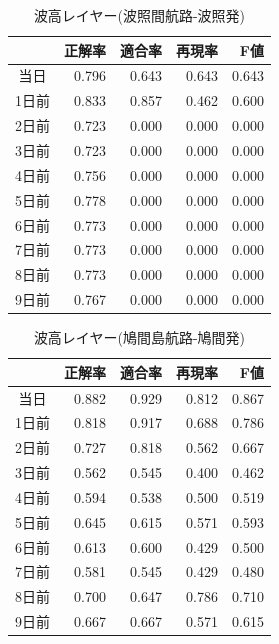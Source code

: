 \documentclass[twocolumn,twoside,9.5pt]{jsarticle}
\begin{document}
\begin{table}[H]
  \begin{center}
    \caption{波高レイヤー(波照間航路-波照発)}
    \begin{tabular}{|c|r|r|r|r|} \hline
   &正解率 & 適合率 & 再現率 & F値 \\ \hline
      当日&0.796 &0.643 &0.643 &0.643 \\ \hline
     1日前 & 0.833 & 0.857 & 0.462 & 0.600 \\ \hline
      2日前 & 0.723 & 0.000 & 0.000 & 0.000 \\ \hline
      3日前 & 0.723 & 0.000 & 0.000 & 0.000 \\ \hline 
      4日前 & 0.756 & 0.000 & 0.000 & 0.000 \\ \hline 
      5日前 & 0.778 & 0.000 & 0.000 & 0.000 \\ \hline 
      6日前 & 0.773 & 0.000 & 0.000 & 0.000 \\ \hline 
      7日前 & 0.773 & 0.000 & 0.000 & 0.000 \\ \hline 
      8日前 & 0.773 & 0.000 & 0.000 & 0.000 \\ \hline 
      9日前 & 0.767 & 0.000 & 0.000 & 0.000 \\ \hline 
    \end{tabular}    
    \label{img_wave_hateruma}
  \end{center}
\end{table}

\begin{table}[H]
  \begin{center}
    \caption{波高レイヤー(鳩間島航路-鳩間発)}
    \begin{tabular}{|c|r|r|r|r|} \hline
   &正解率 & 適合率 & 再現率 & F値 \\ \hline
      当日 & 0.882 & 0.929 & 0.812 & 0.867 \\ \hline
     1日前 & 0.818 & 0.917 & 0.688 & 0.786 \\ \hline
      2日前 & 0.727 & 0.818 & 0.562 & 0.667 \\ \hline
      3日前 & 0.562 & 0.545 & 0.400 & 0.462 \\ \hline 
      4日前 & 0.594 & 0.538 & 0.500 & 0.519 \\ \hline 
      5日前 & 0.645 & 0.615 & 0.571 & 0.593 \\ \hline 
      6日前 & 0.613 & 0.600 & 0.429 & 0.500 \\ \hline 
      7日前 & 0.581 & 0.545 & 0.429 & 0.480 \\ \hline 
      8日前 & 0.700 & 0.647 & 0.786 & 0.710 \\ \hline 
      9日前 & 0.667 & 0.667 & 0.571 & 0.615 \\ \hline 
    \end{tabular}    
    \label{img_wave_hatoma}
  \end{center}
\end{table}
\end{document}
